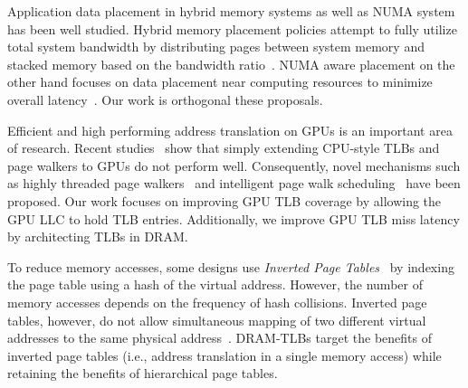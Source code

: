  Application data
placement in hybrid memory systems as well as NUMA system has been
well studied. Hybrid memory placement policies attempt to fully
utilize total system bandwidth by distributing pages between system
memory and stacked memory based on the bandwidth
ratio~\cite{bwa,batman}. NUMA aware placement on the other hand
focuses on data placement near computing resources to minimize overall
latency~\cite{numa-traffic, numa-OSsupport, numa-bolosky}. Our work is
orthogonal these proposals.

 Efficient and
high performing address translation on GPUs is an important area of
research. Recent studies~\cite{power2014supporting, pichaigpu} show
that simply extending CPU-style TLBs and page walkers to GPUs do not
perform well. Consequently, novel mechanisms such as highly threaded
page walkers~\cite{power2014supporting} and intelligent page walk
scheduling~\cite{pichaigpu} have been proposed. Our work focuses on
improving GPU TLB coverage by allowing the GPU LLC to hold TLB
entries. Additionally, we improve GPU TLB miss latency by architecting TLBs in DRAM.

 To reduce memory
accesses, some designs use {\em Inverted Page
Tables}~\cite{invertedPT,invertedPT2} by indexing the page table using
a hash of the virtual address. However, the number of memory accesses
depends on the frequency of hash collisions. Inverted page tables,
however, do not allow simultaneous mapping of two different virtual
addresses to the same physical address~\cite{invertedPT}. DRAM-TLBs
target the benefits of inverted page tables (i.e., address translation
in a single memory access) while retaining the benefits of
hierarchical page tables.




